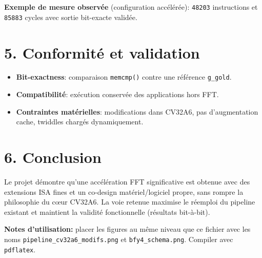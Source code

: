 \documentclass[10pt,a4paper]{article}
\begin{document}
\textbf{Exemple de mesure observée} (configuration accélérée): \texttt{48203} instructions et \texttt{85883} cycles avec sortie bit-exacte validée.

\section*{5. Conformité et validation}
\begin{itemize}[leftmargin=1.2em]
    \item \textbf{Bit-exactness}: comparaison \texttt{memcmp()} contre une référence \texttt{g\_gold}.
    \item \textbf{Compatibilité}: exécution conservée des applications hors FFT.
    \item \textbf{Contraintes matérielles}: modifications dans CV32A6, pas d'augmentation cache, twiddles chargés dynamiquement.
\end{itemize}

\section*{6. Conclusion}
Le projet démontre qu'une accélération FFT significative est obtenue avec des extensions ISA fines et un co-design matériel/logiciel propre, sans rompre la philosophie du cœur CV32A6. La voie retenue maximise le réemploi du pipeline existant et maintient la validité fonctionnelle (résultats bit-à-bit).

\vfill
\small
\textbf{Notes d'utilisation:} placer les figures au même niveau que ce fichier avec les noms
\texttt{pipeline\_cv32a6\_modifs.png} et \texttt{bfy4\_schema.png}. Compiler avec \texttt{pdflatex}.
\end{document}
